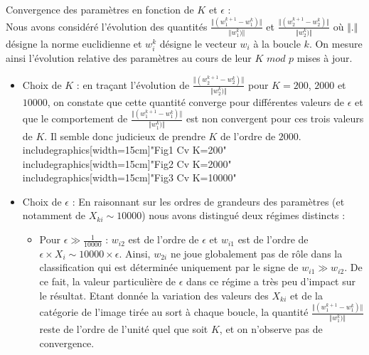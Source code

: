 \documentclass[a4paper,11pt]{article}
\begin{document}
Convergence des paramètres en fonction de $K$ et $\epsilon$ :\\
Nous avons considéré l'évolution des quantités $  \frac{\Vert(w_1^{k+1} - w_1^{k})\Vert}{\Vert w_1^{k})\Vert}$ et $  \frac{\Vert(w_2^{k+1} - w_2^{k})\Vert}{\Vert w_2^{k})\Vert}$ où $\Vert . \Vert$ désigne la norme euclidienne et $w_i^k$ désigne le vecteur $w_i$ à la boucle $k$. On mesure ainsi l'évolution relative des paramètres au cours de leur $K$ $mod$ $p$ mises à jour. 

\begin{itemize}
	\item  Choix de $K$ : en traçant l'évolution de $  \frac{\Vert(w_2^{k+1} - w_2^{k})\Vert}{\Vert w_2^{k})\Vert}$ pour $K = 200$, $2000$ et $10000$, on constate que cette quantité converge pour différentes valeurs de $\epsilon$ et que le comportement de $  \frac{\Vert(w_1^{k+1} - w_1^{k})\Vert}{\Vert w_1^{k})\Vert}$ est non convergent pour ces trois valeurs de $K$. Il semble donc judicieux de prendre $K$ de l'ordre de $2000$. \\

includegraphics[width=15cm]{"Fig1 Cv K=200"}\\
includegraphics[width=15cm]{"Fig2 Cv K=2000"}\\
includegraphics[width=15cm]{"Fig3 Cv K=10000"}\\
	
	\item Choix de $\epsilon$ : En raisonnant sur les ordres de grandeurs des paramètres (et notamment de $X_{ki} \sim 10000$) nous avons distingué deux régimes distincts :\\
	
	\begin{itemize}
		\item Pour $\epsilon \gg \frac{1}{10000}$ : $w_{i2}$ est de l'ordre de $\epsilon$ et $w_{i1}$ est de l'ordre de $\epsilon \times X_i \sim 10000 \times \epsilon$. Ainsi, $w_{2i}$ ne joue globalement pas de rôle dans la classification qui est déterminée uniquement par le signe de $w_{i1} \gg w_{i2}$. De ce fait, la valeur particulière de $\epsilon$ dans ce régime a très peu d'impact sur le résultat. Etant donnée la variation des valeurs des $X_{ki}$ et de la catégorie de l'image tirée au sort à chaque boucle, la quantité $  \frac{\Vert(w_1^{k+1} - w_1^{k})\Vert}{\Vert w_1^{k})\Vert}$ reste de l'ordre de l'unité quel que soit $K$, et on n'observe pas de convergence.\\
		

\end{itemize}
\end{itemize}
\end{document}
